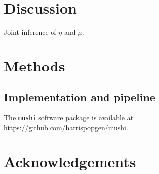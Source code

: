 \documentclass[11pt]{article}
\begin{document}
\section*{Discussion}\label{sec:discussion}

Joint inference of $\eta$ and $\mu$.


\section*{Methods}\label{sec:methods}

\subsection*{Implementation and pipeline}\label{sec:methods:tool}

The \texttt{mushi} software package is available at \url{https://github.com/harrispopgen/mushi}.

\section*{Acknowledgements}\label{sec:ack}





\appendix

\end{document}
